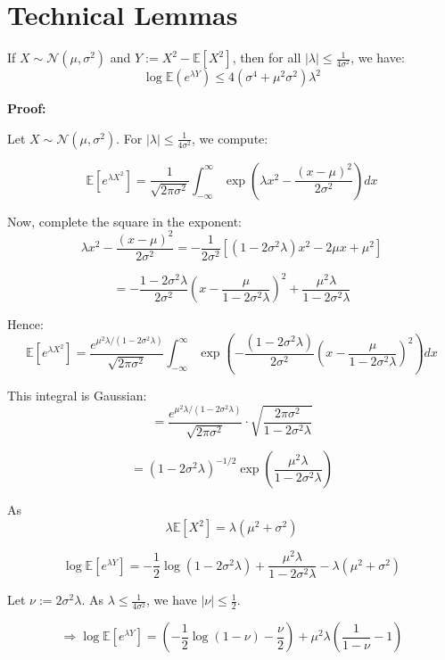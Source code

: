 \section{Technical Lemmas}
\begin{lemma}\label{lem:gaussian-sub-exp}
    If $X \sim \mathcal{N}(\mu, \sigma^2)$ and $Y := X^2 - \mathbb{E}[X^2]$,  
then for all $|\lambda| \leq \frac{1}{4\sigma^2}$, we have:
\[
\log \mathbb{E}(e^{\lambda Y}) \leq 4 \left( \sigma^4 + \mu^2 \sigma^2 \right) \lambda^2
\]
\end{lemma}
\textbf{Proof:} 

Let $X \sim \mathcal{N}(\mu, \sigma^2)$. For $|\lambda| \leq \frac{1}{4\sigma^2}$, we compute:

\[
\mathbb{E}\left[e^{\lambda X^2}\right] 
= \frac{1}{\sqrt{2\pi \sigma^2}} \int_{-\infty}^{\infty} \exp\left( \lambda x^2 - \frac{(x - \mu)^2}{2\sigma^2} \right) dx
\]

Now, complete the square in the exponent:
\[
\lambda x^2 - \frac{(x - \mu)^2}{2\sigma^2} 
= -\frac{1}{2\sigma^2} \left[ (1 - 2\sigma^2 \lambda)x^2 - 2\mu x + \mu^2 \right]
\]

\[
= -\frac{1 - 2\sigma^2 \lambda}{2\sigma^2} 
\left( x-\frac{\mu}{1 - 2\sigma^2 \lambda} \right)^2 
+ \frac{\mu^2 \lambda}{1 - 2\sigma^2 \lambda}
\]

Hence:
\[
\mathbb{E}\left[e^{\lambda X^2}\right] 
= \frac{e^{\mu^2 \lambda / (1 - 2\sigma^2 \lambda)}}{\sqrt{2\pi \sigma^2}} 
\int_{-\infty}^{\infty} 
\exp\left( - \frac{(1 - 2\sigma^2 \lambda)}{2\sigma^2} 
\left( x-\frac{ \mu}{1 - 2\sigma^2 \lambda} \right)^2 \right) dx
\]

This integral is Gaussian:
\[
= \frac{e^{\mu^2 \lambda / (1 - 2\sigma^2 \lambda)}}{\sqrt{2\pi \sigma^2}} 
\cdot \sqrt{ \frac{2\pi \sigma^2}{1 - 2\sigma^2 \lambda} }
\]

\[
= (1 - 2\sigma^2 \lambda)^{-1/2} \exp\left( \frac{\mu^2 \lambda}{1 - 2\sigma^2 \lambda} \right)
\]

As
\[
\lambda \mathbb{E}[X^2] = \lambda(\mu^2 + \sigma^2)
\]

\[
\log \mathbb{E}[e^{\lambda Y}] 
= -\frac{1}{2} \log(1 - 2\sigma^2 \lambda) 
+ \frac{\mu^2 \lambda}{1 - 2\sigma^2 \lambda} 
- \lambda(\mu^2 + \sigma^2)
\]

Let $\nu := 2\sigma^2 \lambda$.  
As $\lambda \leq \frac{1}{4\sigma^2}$, we have $|\nu| \leq \frac{1}{2}$.

\[
\Rightarrow \log \mathbb{E}[e^{\lambda Y}] 
= \left( -\frac{1}{2} \log(1 - \nu) - \frac{\nu}{2} \right) 
+ \mu^2 \lambda \left( \frac{1}{1 - \nu} - 1 \right)
\]


